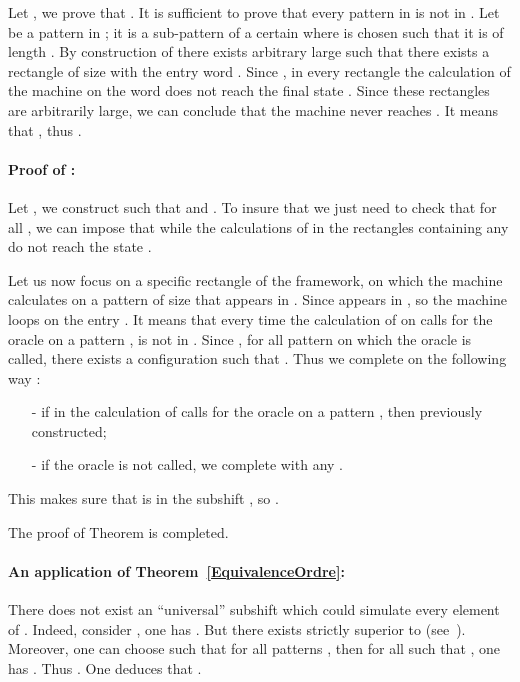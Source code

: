\documentclass[proceedings]{stacs}
\theoremstyle{plain}\newtheorem{satz}[thm]{Satz}
\theoremstyle{definition}\newtheorem{crucial}[thm]{Crucial Definition}
\begin{document}
Let , we prove that . It is sufficient to prove that every pattern in  is not in . Let  be a pattern in ; it is a sub-pattern of a certain  where  is chosen such that it is of length . By construction of  there exists  arbitrary large such that there exists a rectangle of size  with the entry word . Since , in every rectangle the calculation of the machine  on the word  does not reach the final state . Since these rectangles are arbitrarily large, we can conclude that the machine  never reaches . It means that , thus .

\paragraph{Proof of :}

Let , we construct  such that   and . To insure that  we just need to check that for all , we can impose that  while the calculations of  in the rectangles containing any  do not reach the state .

Let us now focus on a specific rectangle of the framework, on which the machine  calculates on a pattern  of size  that appears in . Since  appears in ,  so the machine  loops on the entry . It means that every time the calculation of  on  calls for the oracle on a pattern ,  is not in . Since , for all pattern  on which the oracle is called, there exists a configuration  such that . Thus we complete  on the following way :
\begin{itemize}
\item[-] if in  the calculation of  calls for the oracle on a pattern , then  previously constructed;
\item[-] if the oracle is not called, we complete  with any .
\end{itemize}
This makes sure that  is in the subshift , so .

\vspace{0.2cm}

The proof of Theorem is completed.\hfill{\tiny }



\paragraph{\textbf{An application of Theorem~\ref{EquivalenceOrdre}:}}
 There does not exist an ``universal'' subshift  which could simulate every element of . Indeed, consider , one has . But there exists  strictly superior to  (see~\cite{rogersjr1987trf}). Moreover, one can choose  such that for all patterns , then for all  such that , one has . Thus . One deduces that .
\end{document}
